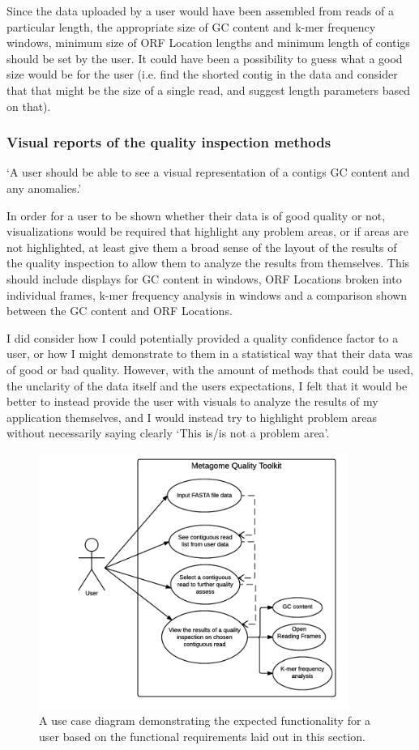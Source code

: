 Since the data uploaded by a user would have been assembled from reads of a particular length, the appropriate size of GC content and k-mer frequency windows, minimum size of ORF Location lengths and minimum length of contigs should be set by the user. It could have been a possibility to guess what a good size would be for the user (i.e. find the shorted contig in the data and consider that that might be the size of a single read, and suggest length parameters based on that).

\subsubsection{Visual reports of the quality inspection methods}
`A user should be able to see a visual representation of a contigs GC content and any anomalies.'

In order for a user to be shown whether their data is of good quality or not, visualizations would be required that highlight any problem areas, or if areas are not highlighted, at least give them a broad sense of the layout of the results of the quality inspection to allow them to analyze the results from themselves. This should include displays for GC content in windows, ORF Locations broken into individual frames, k-mer frequency analysis in windows and a comparison shown between the GC content and ORF Locations.

I did consider how I could potentially provided a quality confidence factor to a user, or how I might demonstrate to them in a statistical way that their data was of good or bad quality. However, with the amount of methods that could be used, the unclarity of the data itself and the users expectations, I felt that it would be better to instead provide the user with visuals to analyze the results of my application themselves, and I would instead try to highlight problem areas without necessarily saying clearly `This is/is not a problem area'.

\begin{figure}[H]
 \centering
\includegraphics[width=0.9\textwidth]{images/usecase}
\caption{A use case diagram demonstrating the expected functionality for a user based on the functional requirements laid out in this section.}
\end{figure}

